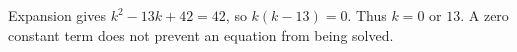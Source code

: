 Expansion gives $k^2-13k+42=42$, so $k(k-13)=0$. Thus $\boxed{k=0\text{ or }13}$. A zero constant term does not prevent an equation from being solved.

